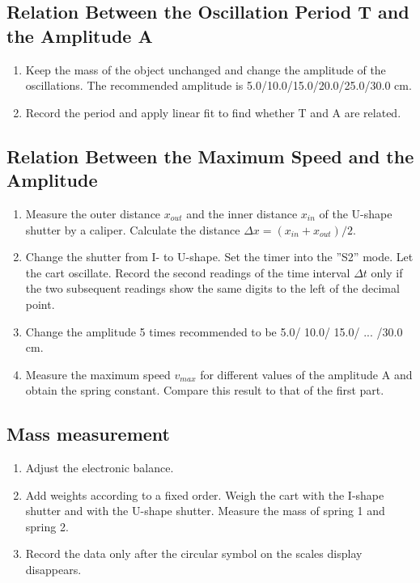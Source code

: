 \documentclass[11pt,a4paper]{article}
\begin{document}
\subsection{Relation Between the Oscillation Period T and the Amplitude A}
\begin{enumerate}[1.]
    \item  Keep the mass of the object unchanged and change the amplitude of the oscillations. The
    recommended amplitude is 5.0/10.0/15.0/20.0/25.0/30.0 cm.
    \item Record the period and apply linear fit to find whether T and A are related.
\end{enumerate}
\subsection{ Relation Between the Maximum Speed and the Amplitude}
\begin{enumerate}[1.]
    \item  Measure the outer distance $x_{out}$ and the inner distance $x_{in}$ of the U-shape shutter by
    a caliper. Calculate the distance $\Delta x=(x_{in}+x_{out})/2$.
    \item Change the shutter from I- to U-shape. Set the timer into the ”S2” mode. Let the cart
    oscillate. Record the second readings of the time interval $\Delta t$ only if the two subsequent
    readings show the same digits to the left of the decimal point.
    \item Change the amplitude 5 times recommended to be 5.0/ 10.0/ 15.0/ ... /30.0 cm.
    \item  Measure the maximum speed $v_{max}$ for different values of the amplitude A and obtain the spring constant. Compare this result to that of the first part.
\end{enumerate}
\subsection{Mass measurement}
\begin{enumerate}[1.]
    \item Adjust the electronic balance.
    \item Add weights according to a fixed order. Weigh the cart with the I-shape shutter and
    with the U-shape shutter. Measure the mass of spring 1 and spring 2.
    \item Record the data only after the circular symbol on the scales display disappears.
\end{enumerate}
\end{document}
